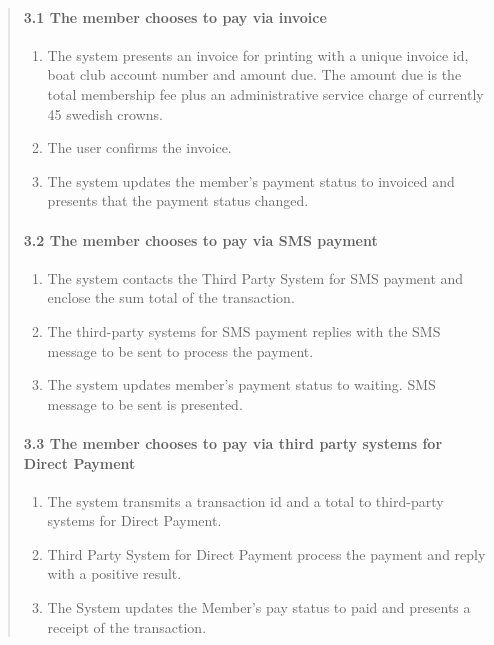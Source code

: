 \begin{quote}
\paragraph{3.1 The member chooses to pay via
invoice}\label{the-member-chooses-to-pay-via-invoice}

\begin{enumerate}
\tightlist
\item
  The system presents an invoice for printing with a unique invoice id,
  boat club account number and amount due. The amount due is the total
  membership fee plus an administrative service charge of currently 45
  swedish crowns.
\item
  The user confirms the invoice.
\item
  The system updates the member's payment status to invoiced and
  presents that the payment status changed.
\end{enumerate}

\paragraph{3.2 The member chooses to pay via SMS
payment}\label{the-member-chooses-to-pay-via-sms-payment}

\begin{enumerate}
\tightlist
\item
  The system contacts the Third Party System for SMS payment and enclose
  the sum total of the transaction.
\item
  The third-party systems for SMS payment replies with the SMS message
  to be sent to process the payment.
\item
  The system updates member's payment status to waiting. SMS message to
  be sent is presented.
\end{enumerate}

\paragraph{3.3 The member chooses to pay via third party systems for
Direct
Payment}\label{the-member-chooses-to-pay-via-third-party-systems-for-direct-payment}

\begin{enumerate}
\tightlist
\item
  The system transmits a transaction id and a total to third-party
  systems for Direct Payment.
\item
  Third Party System for Direct Payment process the payment and reply
  with a positive result.
\item
  The System updates the Member's pay status to paid and presents a
  receipt of the transaction.
\end{enumerate}


\end{quote}
